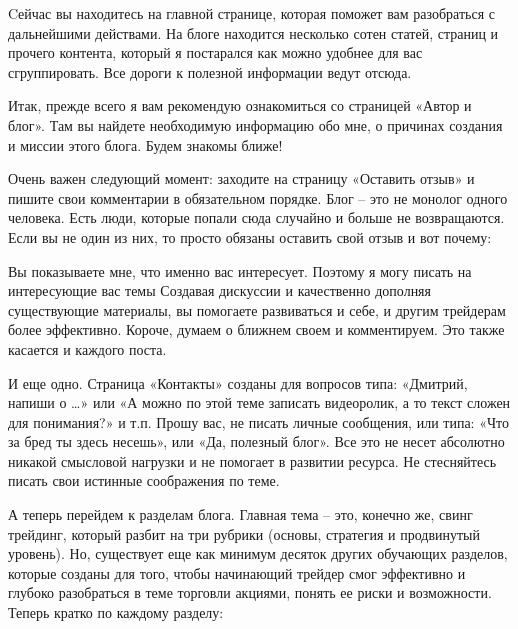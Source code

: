 \documentclass{book}
\begin{document}
Cейчас вы находитесь на главной странице, которая поможет вам разобраться с дальнейшими действами. На блоге находится несколько сотен статей, страниц и прочего контента, который я постарался как можно удобнее для вас сгруппировать. Все дороги к полезной информации ведут отсюда.

Итак, прежде всего я вам рекомендую ознакомиться со страницей «Автор и блог». Там вы найдете необходимую информацию обо мне, о причинах создания и миссии этого блога. Будем знакомы ближе!

Очень важен следующий момент: заходите на страницу «Оставить отзыв» и пишите свои комментарии в обязательном порядке. Блог – это не монолог одного человека. Есть люди, которые попали сюда случайно и больше не возвращаются. Если вы не один из них, то просто обязаны оставить свой отзыв и вот почему:

Вы показываете мне, что именно вас интересует. Поэтому я могу писать на интересующие вас темы
Создавая дискуссии и качественно дополняя существующие материалы, вы помогаете развиваться и себе, и другим трейдерам более эффективно.
Короче, думаем о ближнем своем и комментируем. Это также касается и каждого поста.

И еще одно. Страница «Контакты» созданы для вопросов типа: «Дмитрий, напиши о …» или «А можно по этой теме записать видеоролик, а то текст сложен для понимания?» и т.п. Прошу вас, не писать личные сообщения, или типа: «Что за бред ты здесь несешь», или «Да, полезный блог». Все это не несет абсолютно никакой смысловой нагрузки и не помогает в развитии ресурса. Не стесняйтесь писать свои истинные соображения по теме.

А теперь перейдем к разделам блога. Главная тема – это, конечно же, свинг трейдинг, который разбит на три рубрики (основы, стратегия и продвинутый уровень). Но, существует еще как минимум десяток других обучающих разделов, которые созданы для того, чтобы начинающий трейдер смог эффективно и глубоко разобраться в теме торговли акциями, понять ее риски и возможности. Теперь кратко по каждому разделу:
\end{document}
